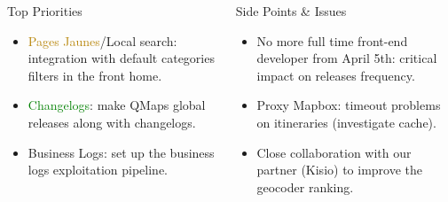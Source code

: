 \documentclass[5pt]{beamer}
\begin{document}
\begin{frame}
\begin{columns}[c]
\begin{columns}[c]
\begin{block}{Top Priorities}
\begin{itemize}
							\item \textcolor{darkgoldenrod}{Pages Jaunes}/Local search: integration with default categories filters in the front home.
							\item \textcolor{green}{Changelogs}: make QMaps global releases along with changelogs.
							\item \textcolor{darkspringgreen}{Business Logs}: set up the business logs exploitation pipeline.
						\end{itemize}
					\end{block}
					\begin{block}{Side Points \& Issues}
						\begin{itemize}
							\item No more full time \alert{front-end developer} from April 5th: critical impact on releases frequency.
							\item \alert{Proxy Mapbox}: timeout problems on itineraries (investigate cache).
							\item Close collaboration with our partner (Kisio) to improve the geocoder \alert{ranking}.
						\end{itemize}
					\end{block}
			\end{columns}
		\end{columns}
	\end{frame}
\end{document}
